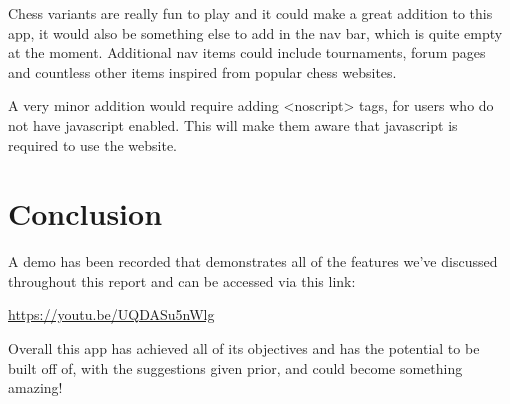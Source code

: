 Chess variants are really fun to play and it could make a great addition to this app, it would also be something else to add in the nav bar, which is quite empty at the moment. Additional nav items could include tournaments, forum pages and countless other items inspired from popular chess websites.

A very minor addition would require adding <noscript> tags, for users who do not have javascript enabled. This will make them aware that javascript is required to use the website.

\section{Conclusion}
\label{Conclusion}

A demo has been recorded that demonstrates all of the features we've discussed throughout this report and can be accessed via this link:

\begin{center}
    \url{https://youtu.be/UQDASu5nWlg}
\end{center}

Overall this app has achieved all of its objectives and has the potential to be built off of, with the suggestions given prior, and could become something amazing!
